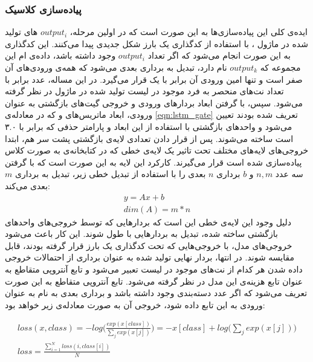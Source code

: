 \subsubsection{پیاده‌سازی کلاسیک}
ایده‌ی کلی این پیاده‌سازی‌ها به این صورت است که در اولین مرحله،
$output_i$
های تولید شده در ماژول 
،
با استفاده از کدگذاری یک بارز شکل جدیدی پیدا می‌کنند. این کدگذاری به این صورت انجام می‌شود که اگر 
تعداد
$output_i$
وجود داشته باشد، داده‌ی
ام این مجموعه که
$output_k$
نام دارد، تبدیل به برداری
بعدی می‌شود که همه‌ی ورودی‌های آن صفر است و تنها 
امین ورودی آن برابر با یک قرار می‌گیرد.
در این مساله، عدد 
برابر با تعداد نت‌های منحصر به فرد موجود در لیست
تولید شده در ماژول
در نظر گرفته می‌شود.
سپس، با گرفتن ابعاد بردارهای ورودی و خروجی گیت‌های بازگشتی به عنوان ورودی، ابعاد ماتریس‌های
 و 
که در معادله‌ی
\ref{eqn:lstm_gate}
تعریف شده بودند تعیین می‌شود و واحدهای بازگشتی با استفاده از این ابعاد و پارامتر حذفی که برابر با ۳.۰ است ساخته می‌شوند. پس از قرار دادن تعدادی لایه‌ی بازگشتی پشت سر هم، ابتدا خروجی‌های لایه‌های مختلف تحت تاثیر یک لایه‌ی خطی که در کتابخانه‌ی
به صورت کلاس
پیاده‌سازی شده است قرار می‌گیرند. کارکرد این لایه به این صورت است که با گرفتن سه عدد
$n, m$ و $b$
برداری 
$n$
بعدی را با استفاده از تبدیل خطی زیر، تبدیل به برداری
$m$
بعدی می‌کند:
\begin{equation}
\begin{gathered}
       y = Ax + b \\
       dim(A) = m * n
\end{gathered}
\end{equation}
دلیل وجود این لایه‌ی خطی این است که بردارهایی که توسط خروجی‌های واحدهای بازگشتی ساخته شده، تبدیل به بردارهایی با طول
شوند.  این کار باعث می‌شود خروجی‌های مدل، با خروجی‌هایی که تحت کدگذاری یک بارز قرار گرفته بودند، قابل مقایسه شوند.
در انتها، بردار نهایی تولید شده به عنوان برداری از احتمالات خروجی داده شدن هر کدام از نت‌های موجود در لیست 
تعبیر می‌شود و تابع آنتروپی متقاطع
به عنوان تابع هزینه‌ی این مدل در نظر گرفته می‌شود.
تابع آنتروپی متقاطع به این صورت تعریف می‌شود که اگر
عدد دسته‌بندی وجود داشته باشد و برداری 
بعدی به نام 
به عنوان ورودی به این تابع داده شود، خروجی آن به صورت معادله‌ی زیر خواهد بود:

\begin{equation}
    \begin{gathered}
       loss(x, class) = -log\big(\frac{exp(x[class])}{\sum_j exp(x[j])}\big) = -x[class] + log\big(\sum_j exp(x[j])\big) \\
       loss = \frac{
        \sum_{i=1}^{N} loss(i, class[i])
       }{N}
    \end{gathered}
\end{equation}

